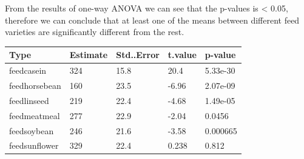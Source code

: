 \documentclass[
]{article}
\newenvironment{Shaded}{\begin{snugshade}}{\end{snugshade}}
\newcommand{\AttributeTok}[1]{\textcolor[rgb]{0.77,0.63,0.00}{#1}}
\newcommand{\CommentTok}[1]{\textcolor[rgb]{0.56,0.35,0.01}{\textit{#1}}}
\newcommand{\ConstantTok}[1]{\textcolor[rgb]{0.00,0.00,0.00}{#1}}
\newcommand{\DecValTok}[1]{\textcolor[rgb]{0.00,0.00,0.81}{#1}}
\newcommand{\FunctionTok}[1]{\textcolor[rgb]{0.00,0.00,0.00}{#1}}
\newcommand{\NormalTok}[1]{#1}
\newcommand{\OtherTok}[1]{\textcolor[rgb]{0.56,0.35,0.01}{#1}}
\newcommand{\SpecialCharTok}[1]{\textcolor[rgb]{0.00,0.00,0.00}{#1}}
\newcommand{\StringTok}[1]{\textcolor[rgb]{0.31,0.60,0.02}{#1}}
\begin{document}
From the results of one-way ANOVA we can see that the p-values is
\textless{} 0.05, therefore we can conclude that at least one of the
means between different feed varieties are significantly different from
the rest.

\begin{Shaded}
\end{Shaded}

\begin{longtable}[]{@{}lllll@{}}
\toprule
Type & Estimate & Std..Error & t.value & p-value\tabularnewline
\midrule
\endhead
feedcasein & 324 & 15.8 & 20.4 & 5.33e-30\tabularnewline
feedhorsebean & 160 & 23.5 & -6.96 & 2.07e-09\tabularnewline
feedlinseed & 219 & 22.4 & -4.68 & 1.49e-05\tabularnewline
feedmeatmeal & 277 & 22.9 & -2.04 & 0.0456\tabularnewline
feedsoybean & 246 & 21.6 & -3.58 & 0.000665\tabularnewline
feedsunflower & 329 & 22.4 & 0.238 & 0.812\tabularnewline
\bottomrule
\end{longtable}
\end{document}
